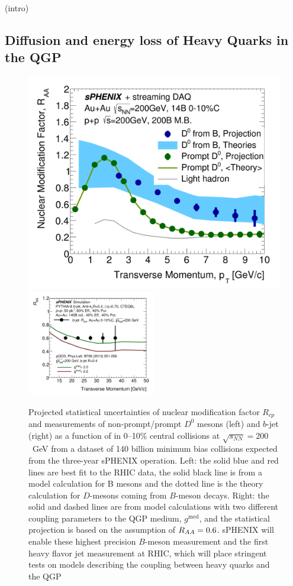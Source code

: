 (intro)

\subsection{Diffusion and energy loss of Heavy Quarks in the QGP}


\begin{figure}[htbp]
\centering
\includegraphics[width=.49\linewidth]{figs/RAA_DB_theory_root_RAADB_pp200B.pdf}
\includegraphics[width=0.5\textwidth]{figs/200pp_pythia8_CTEQ6L_7GeV_ALL_cfg_eneg_DSTReader_root_Draw_HFJetTruth_CrossSection2RAA_Theory_3yr_deta0_70.pdf}
\caption{Projected statistical uncertainties of nuclear modification factor $R_{cp}$ and \raa measurements of non-prompt/prompt $D^0$ mesons (left) and $b$-jet (right) as a function of \pT in 0--10\% central \auau collisions at $\sqrt{s_{NN}}=200$~GeV from a dataset of 140 billion minimum bias \auau collisions expected from the three-year sPHENIX operation. Left: the solid blue and red lines are best fit to the RHIC data, the solid black line is from a model calculation for B mesons and the dotted line is the theory calculation for $D$-mesons coming from $B$-meson decays. Right: the solid and dashed lines are from model calculations with two different coupling parameters to the QGP medium, $g^{\textrm{med}}$, and the statistical projection is based on the assumption of $\mbox{$R_{AA}$} =0.6$. sPHENIX will enable these highest precision $B$-meson measurement and the first heavy flavor jet measurement at RHIC, which will place stringent tests on models describing the coupling between heavy quarks and the QGP~\cite{Huang:2013vaa,Duke,TAMU,PHSD,CUJET}}
\label{fig:HF-inclusive-RAA}
\end{figure}

